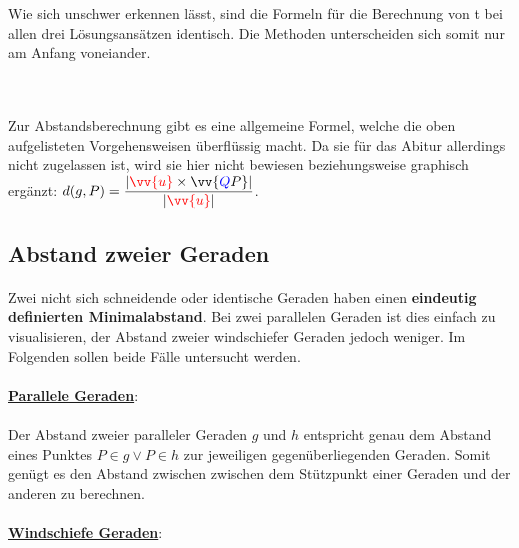         \\
        \begin{Bemerkung}
            \paragraph{} Wie sich unschwer erkennen lässt, sind die Formeln für die Berechnung von t bei allen drei Lösungsansätzen identisch. Die Methoden
            unterscheiden sich somit nur am Anfang voneiander.
        \end{Bemerkung}
        \\
        \begin{Bemerkung}
            \paragraph{} Zur Abstandsberechnung gibt es eine allgemeine Formel, welche die oben aufgelisteten Vorgehensweisen überflüssig macht. Da sie
            für das Abitur allerdings nicht zugelassen ist, wird sie hier nicht bewiesen beziehungsweise graphisch ergänzt:
            $d(g,P) = \dfrac{|\textcolor{red}{\vv{u}}\times\vv{\textcolor{blue}{Q}P}|}{|\textcolor{red}{\vv{u}}|}$.
        \end{Bemerkung}

    \subsection{Abstand zweier Geraden}

        \paragraph{} Zwei nicht sich schneidende oder identische Geraden haben einen \textbf{eindeutig definierten Minimalabstand}. Bei zwei parallelen
        Geraden ist dies einfach zu visualisieren, der Abstand zweier windschiefer Geraden jedoch weniger. Im Folgenden sollen beide Fälle untersucht werden.
        \\
        \\
        \underline{\textbf{Parallele Geraden}}:
            \paragraph{} Der Abstand zweier paralleler Geraden $g$ und $h$ entspricht genau dem Abstand eines Punktes $P \in g \lor P\in h$ zur jeweiligen
            gegenüberliegenden Geraden. Somit genügt es den Abstand zwischen zwischen dem Stützpunkt einer Geraden und der anderen zu berechnen.
        \\
        \\
        \underline{\textbf{Windschiefe Geraden}}:

